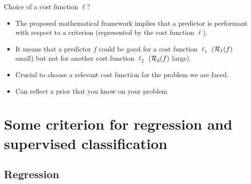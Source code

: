 \documentclass[xcolor={usenames,dvipsnames},handout]{beamer}
\begin{document}
%
%
%
%
%
%

\begin{frame}{Choice of a cost function $\ell$?}
\begin{itemize}
\item The proposed mathematical framework implies that a predictor is performant with respect to a criterion (represented by the cost function $\ell$).
\item  It means that a predictor $f$ could be good for a cost function $\ell_1$ (${\mathcal{R}}_1(f)$ small) but not for another cost function $\ell_2$ (${\mathcal{R}}_2(f)$ large).
\end{itemize}
\pause

\begin{alertblock}{}
\begin{itemize}
\item Crucial to choose a \alert{relevant} cost function for the problem we are faced.
\item Can reflect a \alert{prior} that you know on your problem
\end{itemize}
\end{alertblock}

\end{frame}

\section{Some criterion for regression and supervised classification}

\subsection{Regression}
\end{document}
